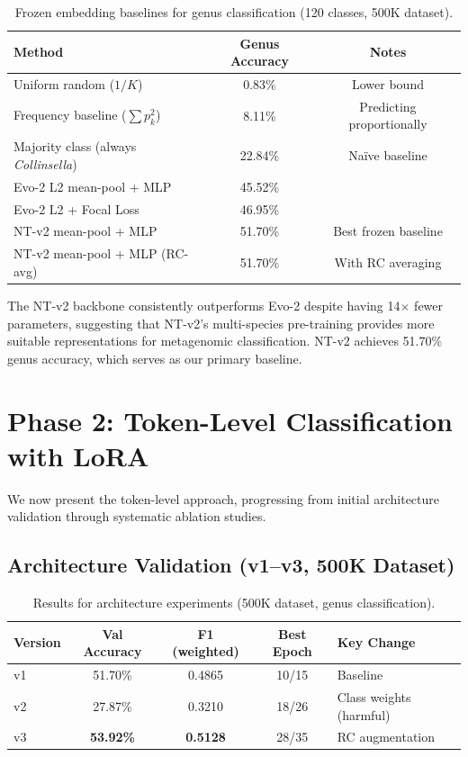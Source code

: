 \begin{table}[htbp]
    \centering
    \caption{Frozen embedding baselines for genus classification (120 classes, 500K dataset).}
    \label{tab:frozen-baselines}
    \begin{tabular}{lcc}
        \toprule
        \textbf{Method} & \textbf{Genus Accuracy} & \textbf{Notes} \\
        \midrule
        Uniform random ($1/K$) & 0.83\% & Lower bound \\
        Frequency baseline ($\sum p_k^2$) & 8.11\% & Predicting proportionally \\
        Majority class (always \textit{Collinsella}) & 22.84\% & Na\"ive baseline \\
        \midrule
        Evo-2 L2 mean-pool + MLP & 45.52\% & \\
        Evo-2 L2 + Focal Loss & 46.95\% & \\
        NT-v2 mean-pool + MLP & 51.70\% & Best frozen baseline \\
        NT-v2 mean-pool + MLP (RC-avg) & 51.70\% & With RC averaging \\
        \bottomrule
    \end{tabular}
\end{table}

The NT-v2 backbone consistently outperforms Evo-2 despite having 14$\times$ fewer parameters, suggesting that NT-v2's multi-species pre-training provides more suitable representations for metagenomic classification. NT-v2 achieves 51.70\% genus accuracy, which serves as our primary baseline.

\section{Phase 2: Token-Level Classification with LoRA}
\label{sec:exp-token-level}

We now present the token-level approach, progressing from initial architecture validation through systematic ablation studies.

\subsection{Architecture Validation (v1--v3, 500K Dataset)}

\begin{table}[htbp]
    \centering
    \caption{Results for architecture experiments (500K dataset, genus classification).}
    \label{tab:v1-v3-results}
    \begin{tabular}{lcccl}
        \toprule
        \textbf{Version} & \textbf{Val Accuracy} & \textbf{F1 (weighted)} & \textbf{Best Epoch} & \textbf{Key Change} \\
        \midrule
        v1 & 51.70\% & 0.4865 & 10/15 & Baseline \\
        v2 & 27.87\% & 0.3210 & 18/26 & Class weights (harmful) \\
        v3 & \textbf{53.92\%} & \textbf{0.5128} & 28/35 & RC augmentation \\
        \bottomrule
    \end{tabular}
\end{table}

